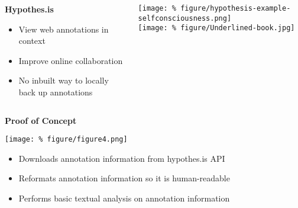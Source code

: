 \documentclass[unknownkeysallowed,usepdftitle=false, parskip=full]{beamer}
\newcommand{\secvariable}{nothing}
\newcommand{\mysection}[1]{\renewcommand{\secvariable}{#1}
}
\begin{document}
\mysection{radar}
\begin{frame}\label{\secvariable}
  \begin{columns}[t]
    \begin{column}[c]{0.45\textwidth}
    \parbox{\linewidth}{

\textbf{Hypothes.is}

      \vspace{12pt}
     
\begin{itemize}
\item View web annotations in context
\item Improve online collaboration
\end{itemize}

  \vspace{12pt}
  
\begin{itemize}
\item No inbuilt way to locally back up annotations
\end{itemize}

      }
    \end{column}
    \begin{column}[c]{0.6\textwidth}
\texttt{[image: \%
figure/hypothesis-example-selfconsciousness.png]}\\
\vspace{12pt}
\texttt{[image: \%
figure/Underlined-book.jpg]}
    \end{column}
  \end{columns}

  
\end{frame}

\mysection{line}
\begin{frame}\label{\secvariable}
\begin{center}
  \vspace{-0.5cm}
      \parbox{\linewidth}{\textbf{Proof of Concept}}
\texttt{[image: \%
  figure/figure4.png]}
\end{center}
  \vspace{-0.2cm}
      \parbox{\linewidth}{
      
\begin{itemize}
\item  Downloads annotation information from hypothes.is API
\item Reformats annotation information so it is human-readable
\item Performs basic textual analysis on annotation information
\end{itemize}
  }
\end{frame}
\end{document}

